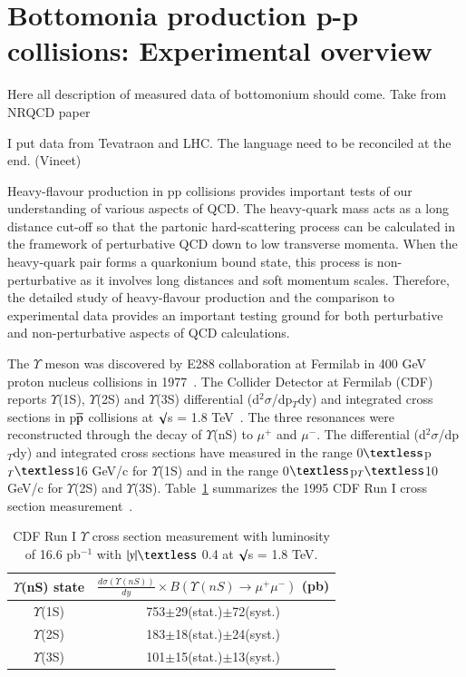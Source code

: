 
\section{Bottomonia production p-p collisions: Experimental overview}

{\color{red}
  Here all description of measured data of bottomonium should come.
  Take from NRQCD paper}

{\color{blue}
  I put data from Tevatraon and LHC. The language need to be reconciled at the end. (Vineet)} 

Heavy-flavour production in pp collisions provides important tests of our understanding of various aspects of QCD.
The heavy-quark mass acts as a long distance cut-off so that the partonic hard-scattering process can be calculated
in the framework of perturbative QCD down to low transverse momenta. When the heavy-quark pair forms a quarkonium bound
state, this process is non-perturbative as it involves long distances and soft momentum scales. Therefore, the detailed
study of heavy-flavour production and the comparison to experimental data provides an important testing ground for
both perturbative and non-perturbative aspects of QCD calculations.


The $\Upsilon$ meson was discovered by E288 collaboration at Fermilab in 400 GeV proton nucleus
collisions in 1977~\cite{PhysRevLett.39.252}.
The Collider Detector at Fermilab (CDF) reports $\Upsilon$(1S), $\Upsilon$(2S) and $\Upsilon$(3S) 
differential (d$^{2}\sigma$/dp$_{T}$dy) and integrated cross sections in p$\overline{\rm p}$ collisions at
$\surd$s = 1.8 TeV~\cite{CDF:1995gwi}. The three resonances were reconstructed through the decay of
$\Upsilon$(nS) to $\mu^{+}$ and $\mu^{-}$. The differential (d$^{2}\sigma$/dp$_{T}$dy) and integrated
cross sections have measured in the range 0$\textless$p$_{T}\textless$16 GeV/c for $\Upsilon$(1S) and in the range
0$\textless$p$_{T}\textless$10 GeV/c for $\Upsilon$(2S) and $\Upsilon$(3S). Table~\ref{Tab:YCrossCDF95} summarizes
the 1995 CDF Run I cross section measurement~\cite{CDF:1995gwi}.    

\begin{table}
  \begin{center}
    \caption[]{CDF Run I $\Upsilon$ cross section measurement with luminosity of 16.6 pb$^{-1}$ with $|y|\textless$ 0.4 at
    $\surd$s = 1.8 TeV.}
\label{Tab:YCrossCDF95}
\begin{tabular}{cc} 
\hline 
\hline
$\Upsilon$(nS) state             &$\frac{d\sigma(\Upsilon(nS))}{dy}\times B(\Upsilon(nS)\rightarrow\mu^{+}\mu^{-})$ (pb)    \\              
\hline
$\Upsilon$(1S)                   &753$\pm$29(stat.)$\pm$72(syst.)\\
$\Upsilon$(2S)                   &183$\pm$18(stat.)$\pm$24(syst.)\\
$\Upsilon$(3S)                   &101$\pm$15(stat.)$\pm$13(syst.)\\   
\hline
\hline
\end{tabular}
\end{center}
\end{table}

